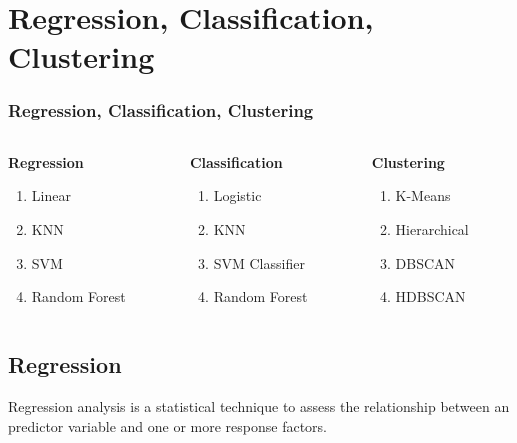 \documentclass{beamer}
\begin{document}
\section{Regression, Classification, Clustering}
\begin{frame}\frametitle{Regression, Classification, Clustering}
\begin{columns}
	\begin{column}{0.3\textwidth}
		\textbf{Regression}
		\begin{enumerate}
			\item Linear
			\item KNN
			\item SVM
			\item Random Forest
		\end{enumerate}
	\end{column}
	\begin{column}{0.3\textwidth}
		\textbf{Classification}
		\begin{enumerate}
			\item Logistic
			\item KNN
			\item SVM Classifier
			\item Random Forest
		\end{enumerate}
	\end{column}
	\begin{column}{0.3\textwidth}
		\textbf{Clustering}
		\begin{enumerate}
			\item K-Means
			\item Hierarchical
			\item DBSCAN
			\item HDBSCAN
		\end{enumerate}
	\end{column}
\end{columns}
\end{frame}



\subsection{Regression}
\begin{frame}
	Regression analysis is a statistical technique to assess the relationship between an predictor variable and one or more response factors.
\end{frame}
\end{document}

